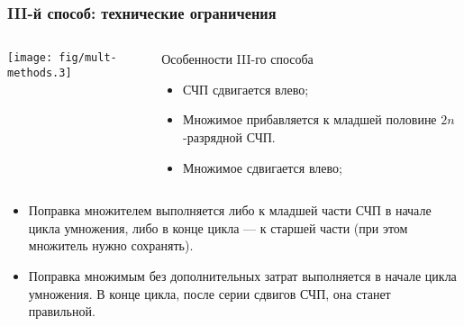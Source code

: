 \begin{frame}
    \frametitle{III-й способ: технические ограничения}
    
    \begin{columns}
            \begin{block}{}
                \texttt{[image: fig/mult-methods.3]}
            \end{block}
            \begin{block}{Особенности III-го способа}
                \begin{itemize}
                    \item СЧП сдвигается влево; 
                    \item Множимое прибавляется к младшей половине $2n$-разрядной СЧП.
                    \item Множимое сдвигается влево;
                \end{itemize}
            \end{block}
    \end{columns}
    
    \begin{itemize}
        \item Поправка множителем выполняется либо к младшей части СЧП в начале цикла умножения, либо в конце цикла --- к старшей части (при этом множитель нужно сохранять).
        \item Поправка множимым без дополнительных затрат выполняется в начале цикла умножения. В конце цикла, после серии сдвигов СЧП, она станет правильной.
    \end{itemize}
\end{frame}    
    
